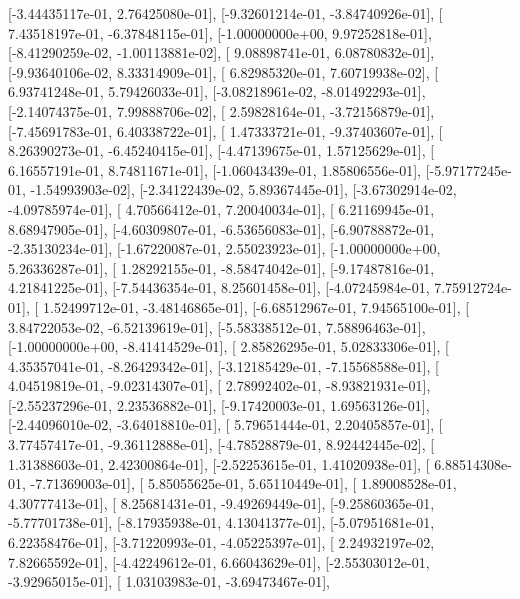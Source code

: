 \documentclass{article}
\begin{document}
       [-3.44435117e-01,  2.76425080e-01],
       [-9.32601214e-01, -3.84740926e-01],
       [ 7.43518197e-01, -6.37848115e-01],
       [-1.00000000e+00,  9.97252818e-01],
       [-8.41290259e-02, -1.00113881e-02],
       [ 9.08898741e-01,  6.08780832e-01],
       [-9.93640106e-02,  8.33314909e-01],
       [ 6.82985320e-01,  7.60719938e-02],
       [ 6.93741248e-01,  5.79426033e-01],
       [-3.08218961e-02, -8.01492293e-01],
       [-2.14074375e-01,  7.99888706e-02],
       [ 2.59828164e-01, -3.72156879e-01],
       [-7.45691783e-01,  6.40338722e-01],
       [ 1.47333721e-01, -9.37403607e-01],
       [ 8.26390273e-01, -6.45240415e-01],
       [-4.47139675e-01,  1.57125629e-01],
       [ 6.16557191e-01,  8.74811671e-01],
       [-1.06043439e-01,  1.85806556e-01],
       [-5.97177245e-01, -1.54993903e-02],
       [-2.34122439e-02,  5.89367445e-01],
       [-3.67302914e-02, -4.09785974e-01],
       [ 4.70566412e-01,  7.20040034e-01],
       [ 6.21169945e-01,  8.68947905e-01],
       [-4.60309807e-01, -6.53656083e-01],
       [-6.90788872e-01, -2.35130234e-01],
       [-1.67220087e-01,  2.55023923e-01],
       [-1.00000000e+00,  5.26336287e-01],
       [ 1.28292155e-01, -8.58474042e-01],
       [-9.17487816e-01,  4.21841225e-01],
       [-7.54436354e-01,  8.25601458e-01],
       [-4.07245984e-01,  7.75912724e-01],
       [ 1.52499712e-01, -3.48146865e-01],
       [-6.68512967e-01,  7.94565100e-01],
       [ 3.84722053e-02, -6.52139619e-01],
       [-5.58338512e-01,  7.58896463e-01],
       [-1.00000000e+00, -8.41414529e-01],
       [ 2.85826295e-01,  5.02833306e-01],
       [ 4.35357041e-01, -8.26429342e-01],
       [-3.12185429e-01, -7.15568588e-01],
       [ 4.04519819e-01, -9.02314307e-01],
       [ 2.78992402e-01, -8.93821931e-01],
       [-2.55237296e-01,  2.23536882e-01],
       [-9.17420003e-01,  1.69563126e-01],
       [-2.44096010e-02, -3.64018810e-01],
       [ 5.79651444e-01,  2.20405857e-01],
       [ 3.77457417e-01, -9.36112888e-01],
       [-4.78528879e-01,  8.92442445e-02],
       [ 1.31388603e-01,  2.42300864e-01],
       [-2.52253615e-01,  1.41020938e-01],
       [ 6.88514308e-01, -7.71369003e-01],
       [ 5.85055625e-01,  5.65110449e-01],
       [ 1.89008528e-01,  4.30777413e-01],
       [ 8.25681431e-01, -9.49269449e-01],
       [-9.25860365e-01, -5.77701738e-01],
       [-8.17935938e-01,  4.13041377e-01],
       [-5.07951681e-01,  6.22358476e-01],
       [-3.71220993e-01, -4.05225397e-01],
       [ 2.24932197e-02,  7.82665592e-01],
       [-4.42249612e-01,  6.66043629e-01],
       [-2.55303012e-01, -3.92965015e-01],
       [ 1.03103983e-01, -3.69473467e-01],
\end{document}
